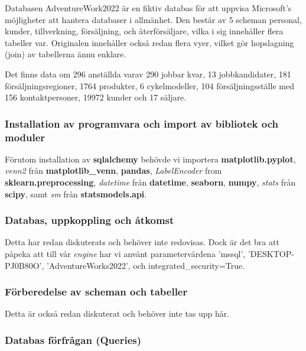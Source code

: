 \documentclass[10pt]{article}
\begin{document}
Databasen AdventureWork2022 är en fiktiv databas för att uppvisa Microsoft's möjligheter att hantera databaser i allmänhet. Den består av 5 scheman personal, kunder, tillverkning, försäljning, och återförsäljare, vilka i sig innehåller flera tabeller var. Originalen innehåller också redan flera vyer, vilket gör hopslagning (join) av tabellerna ännu enklare.

Det finns data om 296 anställda varav 290 jobbar kvar, 13 jobbkandidater, 181 försäljningsregioner, 1764 produkter, 6 cykelmodeller, 104 försäljningsställe med 156 kontaktpersoner, 19972 kunder och 17 säljare.

\subsubsection{Installation av programvara och import av bibliotek och moduler}

Förutom installation av \textbf{sqlalchemy} behövde vi importera \textbf{matplotlib.pyplot}, \emph{venn2} från \textbf{matplotlib\_venn}, \textbf{pandas}, \emph{LabelEncoder} from \textbf{sklearn.preprocessing}, \emph{datetime} från \textbf{datetime}, \textbf{seaborn}, \textbf{numpy}, \emph{stats} från \textbf{scipy}, samt \emph{sm} från \textbf{statsmodels.api}.

\subsubsection{Databas, uppkoppling och åtkomst}

Detta har redan diskuterats och behöver inte redovisas. Dock är det bra att påpeka att till vår \emph{engine} har vi använt parametervärdena 'mssql', 'DESKTOP-PJ0B80O', 'AdventureWorks2022', och integrated\_security=True.

\subsubsection{Förberedelse av scheman och tabeller}
 
 Detta är också redan diskuterat och behöver inte tas upp här.

\subsubsection{Databas förfrågan (Queries)}
\end{document}
